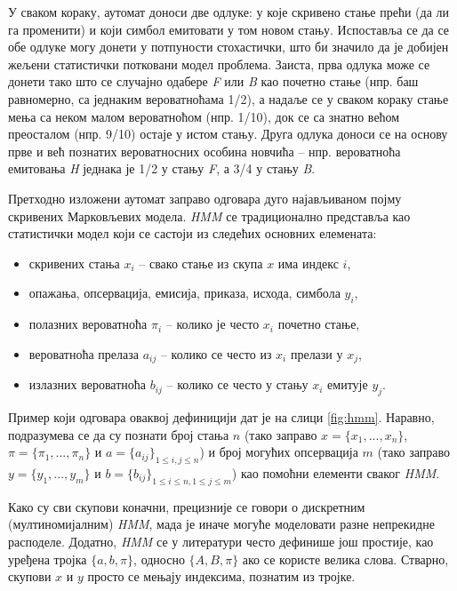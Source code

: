 \documentclass[12pt,oneside]{memoir}
\begin{document}
\begin{CJK}{UTF8}{ipxm}
У сваком кораку, аутомат доноси две одлуке: у које скривено стање прећи (да ли га променити) и који симбол емитовати у том новом стању. Испоставља се да се обе одлуке могу донети у потпуности стохастички, што би значило да је добијен жељени статистички потковани модел проблема. Заиста, прва одлука може се донети тако што се случајно одабере \textit{F} или \textit{B} као почетно стање (нпр. баш равномерно, са једнаким вероватноћама 1/2), а надаље се у сваком кораку стање мења са неком малом вероватноћом (нпр. 1/10), док се са знатно већом преосталом (нпр. 9/10) остаје у истом стању. Друга одлука доноси се на основу прве и већ познатих вероватносних особина новчића -- нпр. вероватноћа емитовања \textit{H} једнака је 1/2 у стању \textit{F}, а 3/4 у стању \textit{B}.

Претходно изложени аутомат заправо одговара дуго најављиваном појму скривених Марковљевих модела. \textit{HMM} се традиционално представља као статистички модел који се састоји из следећих основних елемената:
\begin{itemize}
  \item скривених стања $x_i$ -- свако стање из скупа $x$ има индекс $i$,
  \item опажања, опсервација, емисија, приказа, исхода, симбола $y_i$,
  \item полазних вероватноћа $\pi_i$ -- колико је често $x_i$ почетно стање,
  \item вероватноћа прелаза $a_{ij}$ -- колико се често из $x_i$ прелази у $x_j$,
  \item излазних вероватноћа $b_{ij}$ -- колико се често у стању $x_i$ емитује $y_j$.
\end{itemize}
Пример који одговара оваквој дефиницији дат је на слици \ref{fig:hmm}. Наравно, подразумева се да су познати број стања $n$ (тако заправо $x = \{x_1, ..., x_n\}$, $\pi = \{\pi_1, ..., \pi_n\}$ и $a = \{a_{ij}\}_{1 \leq i, j \leq n}$) и број могућих опсервација $m$ (тако заправо $y = \{y_1, ..., y_m\}$ и $b = \{b_{ij}\}_{1 \leq i \leq n, 1 \leq j \leq m}$) као помоћни елементи сваког \textit{HMM}.

Како су сви скупови коначни, прецизније се говори о дискретним (мултиномијалним) \textit{HMM}, мада је иначе могуће моделовати разне непрекидне расподеле\cite{jordan2004}. Додатно, \textit{HMM} се у литератури често дефинише још простије, као уређена тројка $\{a, b, \pi\}$, односно $\{A, B, \pi\}$ ако се користе велика слова. Стварно, скупови $x$ и $y$ просто се мењају индексима, познатим из тројке.


\end{CJK}
\end{document}
